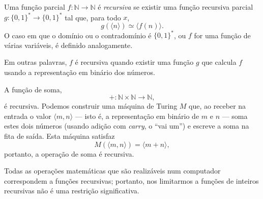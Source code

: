 \begin{definition}
    Uma função parcial $f: \mathbb N \to \mathbb N$ é \emph{recursiva}
    se existir uma função recursiva parcial $g: \{0, 1\}^* \to \{0, 1\}^*$
    tal que, para todo $x$,
    \begin{equation*}
        g(\langle n \rangle) \simeq \langle f(n) \rangle.
    \end{equation*}
    O caso em que o domínio ou o contradomínio é $\{0, 1\}^*$,
    ou $f$ for uma função de várias variáveis,
    é definido analogamente.
\end{definition}

Em outras palavras,
$f$ é recursiva quando existir uma função $g$
que calcula $f$ usando a representação em binário dos números.

\begin{example}
    A função de soma,
    \begin{equation*}
        +: \mathbb N \times \mathbb N \to \mathbb N,
    \end{equation*}
    é recursiva.
    Podemos construir uma máquina de Turing $M$ que,
    ao receber na entrada o valor $\langle m, n \rangle$
    --- isto é, a representação em binário de $m$ e $n$ ---
    soma estes dois números
    (usando adição com \emph{carry}, o ``vai um'')
    e escreve a soma na fita de saída.
    Esta máquina satisfaz
    \begin{equation*}
        M(\langle m, n \rangle) = \langle m+n \rangle,
    \end{equation*}
    portanto, a operação de soma é recursiva.
\end{example}

Todas as operações matemáticas que são realizáveis num computador
correspondem a funções recursivas;
portanto,
nos limitarmos a funções de inteiros recursivas não é uma restrição significativa.
